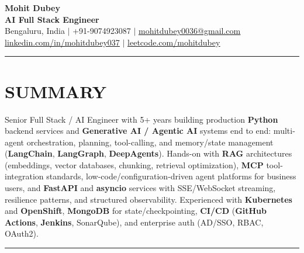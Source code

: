 \documentclass[a4paper]{article}
\newcommand{\sectionline}{
\begin{center}
\vspace{-9pt}
\rule{1\textwidth}{0.5pt}
\end{center}
\vspace{1pt}
}
\begin{document}
\begin{center}
    \textbf{\Huge Mohit Dubey} \\ \vspace{4pt}
    \textbf{AI Full Stack Engineer } \\ \vspace{6pt}
    \small Bengaluru, India $|$ +91-9074923087 $|$ \href{mailto:mohitdubey0036@gmail.com}{\underline{mohitdubey0036@gmail.com}} \\
    \href{https://www.linkedin.com/in/mohit-dubey-037/}{\underline{linkedin.com/in/mohitdubey037}} $|$ \href{https://leetcode.com/u/mohitdubey037/}
    {\underline{leetcode.com/mohitdubey}}
\end{center}


\sectionline
\section*{SUMMARY}
Senior Full Stack / AI Engineer with 5+ years building production \textbf{Python} backend services and \textbf{Generative AI / Agentic AI} systems end to end: multi-agent orchestration, planning, tool-calling, and memory/state management (\textbf{LangChain}, \textbf{LangGraph}, \textbf{DeepAgents}). Hands-on with \textbf{RAG} architectures (embeddings, vector databases, chunking, retrieval optimization), \textbf{MCP} tool-integration standards, low-code/configuration-driven agent platforms for business users, and \textbf{FastAPI} and \textbf{asyncio} services with SSE/WebSocket streaming, resilience patterns, and structured observability. Experienced with \textbf{Kubernetes} and \textbf{OpenShift}, \textbf{MongoDB} for state/checkpointing, \textbf{CI/CD} (\textbf{GitHub Actions}, \textbf{Jenkins}, SonarQube), and enterprise auth (AD/SSO, RBAC, OAuth2).

\sectionline
\end{document}
